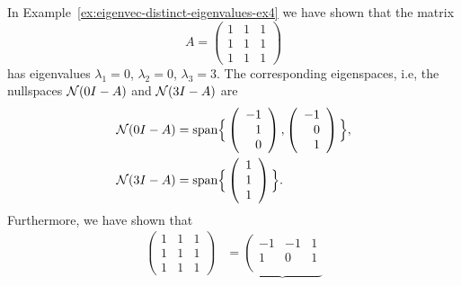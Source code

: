 \documentclass{article}
\begin{document}
 
\begin{example}   \label{ex:diag-symmetric-ex1}
  In Example~\ref{ex:eigenvec-distinct-eigenvalues-ex4} we have shown that the  matrix
   \[
      A = \left( \begin{array}{rrr}
                   1   &  1 &    1\\
                   1   &  1 &    1\\
                   1  &   1 &    1
             \end{array} \right)
  \]
  has eigenvalues  $\lambda_1 =0$,  $\lambda_2 =0$,  $\lambda_3 =3$.
  The corresponding eigenspaces, i.e, the nullspaces $  {\cal N}(0I - A)$
  and ${\cal N}(3I - A)$ are
  \begin{align*}
              {\cal N}(0I - A) &= \mbox{span}\Big\{  \left( \begin{array}{r} -1 \\ 1 \\ 0
                                                                             \end{array} \right) ,
                                                                            \left( \begin{array}{r} -1 \\ 0 \\ 1
                                                                             \end{array} \right) \Big \},                           \\
             {\cal N}(3I - A) &= \mbox{span}\Big\{  \left( \begin{array}{r} 1 \\ 1 \\ 1
                                                                      \end{array} \right) \Big \}.       
   \end{align*}
  Furthermore, we have shown that
  \begin{align*} 
        \left( \begin{array}{rrr}
                  1   &  1 &    1\\
                   1   &  1 &    1\\
                   1  &   1 &    1
          \end{array} \right)
   &=    \underbrace{ \left( \begin{array}{rrr}
                    -1 & -1 & 1 \\
                   1 & 0 & 1 \\

\end{array}}
\end{align*}
\end{example}
\end{document}
